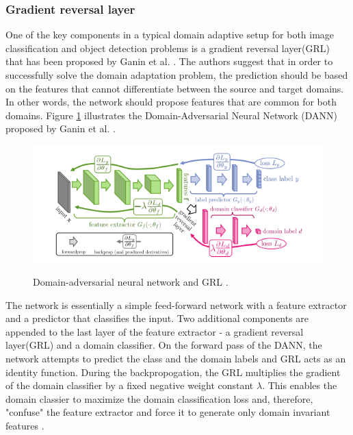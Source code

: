 \subsubsection{Gradient reversal layer}

One of the key components in a typical domain adaptive setup for both image classification and object detection problems is a gradient reversal layer(GRL) that has been proposed by Ganin et al. \cite{Ganin2015}. The authors suggest that in order to successfully solve the domain adaptation problem, the prediction should be based on the features that cannot differentiate between the source and target domains. In other words, the network should propose features that are common for both domains. Figure \ref{DANN} illustrates the Domain-Adversarial Neural Network (DANN) proposed by Ganin et al. \cite{Ganin2015}. 

\begin{figure}[htb]
	\begin{center}
		\includegraphics[width=16cm]{./GRL.png}
	\end{center}
	\caption{Domain-adversarial neural network and GRL \cite{Ganin2015}.}
	\begin{center}
		\label{DANN}
	\end{center}
\end{figure}
\FloatBarrier

The network is essentially a simple feed-forward network with a feature extractor and a predictor that classifies the input. Two additional components are appended to the last layer of the feature extractor - a gradient reversal layer(GRL) and a domain classifier. On the forward pass of the DANN, the network attempts to predict the class and the domain labels and GRL acts as an identity function. During the backpropogation, the GRL multiplies the gradient of the domain classifier by a fixed negative weight constant $\lambda$. This enables the domain classier to maximize the domain classification loss and, therefore, "confuse" the feature extractor and force it to generate only domain invariant features \cite{Ganin2015}. 


